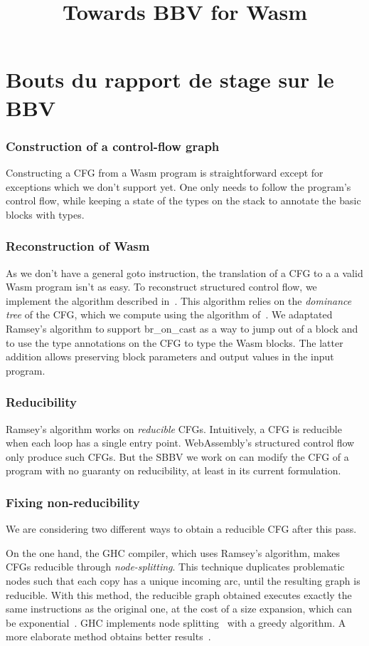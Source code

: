 \documentclass[a4paper,11pt]{article}
\title{Towards BBV for Wasm}
\begin{document}
\sloppy
\maketitle
\section{Bouts du rapport de stage sur le BBV}
\subsubsection{Construction of a control-flow graph}
Constructing a CFG from a Wasm program is straightforward except for exceptions
which we don't support yet. One only needs to follow the program's control flow,
while keeping a state of the types on the stack to annotate the basic blocks
with types.

\subsubsection{Reconstruction of Wasm}
As we don't have a general goto instruction, the translation of a CFG to a a
valid Wasm program isn't as easy. To reconstruct structured control flow, we
implement the algorithm described in~\cite{ramsey2022beyond}. This algorithm
relies on the \emph{dominance tree} of the CFG, which we compute using the
algorithm of~\cite{cooper2001simple}. We adaptated Ramsey's algorithm to support
\textsf{br\_on\_cast} as a way to jump out of a block and to use the type
annotations on the CFG to type the Wasm blocks. The latter addition allows
preserving block parameters and output values in the input program.

\subsubsection{Reducibility}
Ramsey's algorithm works on \emph{reducible} CFGs. Intuitively, a CFG is
reducible when each loop has a single entry point. WebAssembly's structured
control flow only produce such CFGs. But the SBBV we work on can modify the CFG
of a program with no guaranty on reducibility, at least in its current
formulation.

\subsubsection{Fixing non-reducibility}
We are considering two different ways to obtain a reducible CFG after this pass.

On the one hand, the GHC compiler, which uses Ramsey's algorithm, makes CFGs
reducible through \emph{node-splitting}. This technique duplicates problematic
nodes such that each copy has a unique incoming arc, until the resulting graph
is reducible. With this method, the reducible graph obtained executes exactly
the same instructions as the original one, at the cost of a size expansion,
which can be exponential~\cite{carter2003folklore}. GHC implements node
splitting~\cite[Appendix~A]{ramsey2022beyond} with a greedy algorithm. A more
elaborate method obtains better results~\cite{janssen1997making}.
\end{document}
